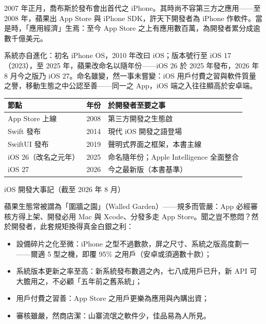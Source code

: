 


2007 年正月，喬布斯於發布會出首代之 iPhone。其時尚不容第三方之應用——至 2008 年，蘋果出 App Store 與 iPhone SDK，許天下開發者為 iPhone 作軟件。當是時，「應用經濟」生焉：至今 App Store 之上有應用數百萬，為開發者累分成逾數千億美元。

系統亦自進化：初名 iPhone OS，2010 年改曰 iOS；版本號行至 iOS 17（2023），至 2025 年，蘋果改命名以隨年份——iOS 26 於 2025 年發布，2026 年 8 月今之版乃 iOS 27。命名雖變，然一事未嘗變：iOS 用戶付費之習與軟件質量之譽，移動生態之中公認至善——同一之 App，iOS 端之入往往顯高於安卓端。

\begin{center}
\begin{tabularx}{\linewidth}{|X|X|X|}
\hline
\textbf{節點} & \textbf{年份} & \textbf{於開發者至要之事} \tabularnewline
\hline
App Store 上線 & 2008 & 第三方開發之生態啟 \tabularnewline
Swift 發布 & 2014 & 現代 iOS 開發之語登場 \tabularnewline
SwiftUI 發布 & 2019 & 聲明式界面之框架，本書主線 \tabularnewline
iOS 26（改名之元年） & 2025 & 命名隨年份；Apple Intelligence 全面整合 \tabularnewline
iOS 27 & 2026 & 今之最新版（本書基準） \tabularnewline
\hline
\end{tabularx}
\end{center}

\begin{center}\small\color{gray}iOS 開發大事記（截至 2026 年 8 月）\end{center}


蘋果生態常被謂為「圍牆之園」（Walled Garden）——規多而管嚴：App 必經審核方得上架、開發必用 Mac 與 Xcode、分發多走 App Store。聞之豈不憋悶？然於開發者，此套規矩換得真金白銀之利：

\begin{itemize}
  \item 設備碎片之化至微：iPhone 之型不過數款，屏之尺寸、系統之版高度劃一——爾適 5 型之機，即覆 95\% 之用戶（安卓或須適數十款）；
  \item 系統版本更新之率至高：新系統發布數週之內，七八成用戶已升，新 API 可大膽用之，不必顧「五年前之舊系統」；
  \item 用戶付費之習善：App Store 之用戶更樂為應用與內購出資；
  \item 審核雖嚴，然商店潔：山寨流氓之軟件少，佳品易為人所見。
\end{itemize}

